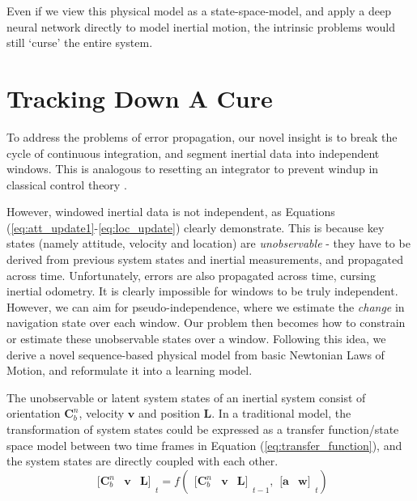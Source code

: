 \documentclass[letterpaper]{article}
\begin{document}
Even if we view this physical model as a state-space-model, and apply a deep neural network directly to model inertial motion, the intrinsic problems would still `curse' the entire system.

\section{Tracking Down A Cure} 
	To address the problems of error propagation, our novel insight is to break the cycle of continuous integration, and segment inertial data into independent windows. This is analogous to resetting an integrator to prevent windup in classical control theory \cite{Hippe2006}.
    
    However, windowed inertial data is not independent, as Equations (\ref{eq:att_update1}-\ref{eq:loc_update}) clearly demonstrate. This is because key states (namely attitude, velocity and location) are \textit{unobservable} - they have to be derived from previous system states and inertial measurements, and propagated across time. Unfortunately, errors are also propagated across time, cursing inertial odometry. It is clearly impossible for windows to be truly independent. However, we can aim for pseudo-independence, where we estimate the \textit{change} in navigation state over each window. %
Our problem then becomes how to constrain or estimate these unobservable states over a window. Following this idea, we derive a novel sequence-based physical model from basic Newtonian Laws of Motion, and reformulate it into a learning model.
    
    The unobservable or latent system states of an inertial system consist of orientation $\mathbf{C}_b^n$, velocity $\mathbf{v}$ and position $\mathbf{L}$. In a traditional model, the transformation of system states could be expressed as a transfer function/state space model between two time frames in Equation (\ref{eq:transfer_function}), and the system states are directly coupled with each other. 
    \begin{equation}
    	\label{eq:transfer_function}
    	\begin{matrix}
        	[\mathbf{C}_b^n &  \mathbf{v} & \mathbf{L}]
        \end{matrix}_t = f(\begin{matrix}[\mathbf{C}_b^n &  \mathbf{v} & \mathbf{L}] \end{matrix}_{t-1}, \begin{matrix}[\mathbf{a} &  \mathbf{w}] \end{matrix}_t)
    \end{equation}
    
\end{document}
